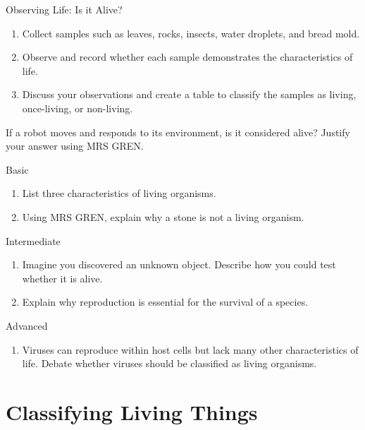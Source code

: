 \begin{investigation}{Observing Life: Is it Alive?}
\begin{enumerate}
    \item Collect samples such as leaves, rocks, insects, water droplets, and bread mold.
    \item Observe and record whether each sample demonstrates the characteristics of life.
    \item Discuss your observations and create a table to classify the samples as living, once-living, or non-living.
\end{enumerate}
\end{investigation}

\begin{stopandthink}
If a robot moves and responds to its environment, is it considered alive? Justify your answer using MRS GREN.
\end{stopandthink}

\begin{tieredquestions}{Basic}
\begin{enumerate}
    \item List three characteristics of living organisms.
    \item Using MRS GREN, explain why a stone is not a living organism.
\end{enumerate}
\end{tieredquestions}

\begin{tieredquestions}{Intermediate}
\begin{enumerate}
    \item Imagine you discovered an unknown object. Describe how you could test whether it is alive.
    \item Explain why reproduction is essential for the survival of a species.
\end{enumerate}
\end{tieredquestions}

\begin{tieredquestions}{Advanced}
\begin{enumerate}
    \item Viruses can reproduce within host cells but lack many other characteristics of life. Debate whether viruses should be classified as living organisms.
\end{enumerate}
\end{tieredquestions}

\section{Classifying Living Things}

